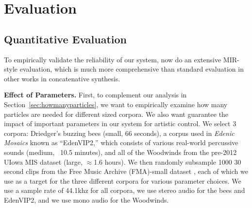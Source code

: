 \documentclass{article}
\begin{document}







\section{Evaluation}

\subsection{Quantitative Evaluation}
\label{sec:quantitativeevaluation}

To empirically validate the reliability of our system, now do an extensive MIR-style evaluation, which is much more comprehensive than standard evaluation in other works in concatenative synthesis.

\textbf{Effect of Parameters.} First, to complement our analysis in Section~\ref{sec:howmanyparticles}, we want to empirically examine how many particles are needed for different sized corpora.  We also want guarantee the impact of important parameters in our system for artistic control.  We select 3 corpora: Driedger's buzzing bees (small, 66 seconds), a corpus used in {\em Edenic Mosaics}\cite{cantil2021} known as ``EdenVIP2,'' which consists of various real-world percussive sounds (medium, ~10.5 minutes), and all of the Woodwinds from the pre-2012 UIowa MIS dataset \cite{uiowadataset} (large, $\approx$1.6 hours).  We then randomly subsample 1000 30 second clips from the Free Music Archive (FMA)-small dataset \cite{fma_dataset}, each of which we use as a target for the three different corpora for various parameter choices.  We use a sample rate of 44.1khz for all corpora, we use stereo audio for the bees and EdenVIP2, and we use mono audio for the Woodwinds.
\end{document}
